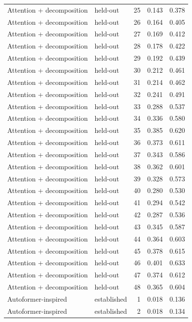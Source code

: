\begin{tabular}{llrrr}
Attention + decomposition & held-out & 25 & 0.143 & 0.378 \\
Attention + decomposition & held-out & 26 & 0.164 & 0.405 \\
Attention + decomposition & held-out & 27 & 0.169 & 0.412 \\
Attention + decomposition & held-out & 28 & 0.178 & 0.422 \\
Attention + decomposition & held-out & 29 & 0.192 & 0.439 \\
Attention + decomposition & held-out & 30 & 0.212 & 0.461 \\
Attention + decomposition & held-out & 31 & 0.214 & 0.462 \\
Attention + decomposition & held-out & 32 & 0.241 & 0.491 \\
Attention + decomposition & held-out & 33 & 0.288 & 0.537 \\
Attention + decomposition & held-out & 34 & 0.336 & 0.580 \\
Attention + decomposition & held-out & 35 & 0.385 & 0.620 \\
Attention + decomposition & held-out & 36 & 0.373 & 0.611 \\
Attention + decomposition & held-out & 37 & 0.343 & 0.586 \\
Attention + decomposition & held-out & 38 & 0.362 & 0.601 \\
Attention + decomposition & held-out & 39 & 0.328 & 0.573 \\
Attention + decomposition & held-out & 40 & 0.280 & 0.530 \\
Attention + decomposition & held-out & 41 & 0.294 & 0.542 \\
Attention + decomposition & held-out & 42 & 0.287 & 0.536 \\
Attention + decomposition & held-out & 43 & 0.345 & 0.587 \\
Attention + decomposition & held-out & 44 & 0.364 & 0.603 \\
Attention + decomposition & held-out & 45 & 0.378 & 0.615 \\
Attention + decomposition & held-out & 46 & 0.401 & 0.633 \\
Attention + decomposition & held-out & 47 & 0.374 & 0.612 \\
Attention + decomposition & held-out & 48 & 0.365 & 0.604 \\
Autoformer-inspired & established & 1 & 0.018 & 0.136 \\
Autoformer-inspired & established & 2 & 0.018 & 0.134 \\

\end{tabular}
